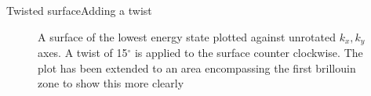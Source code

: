 \documentclass[9pt]{beamer}
\begin{document}
\begin{frame}{Twisted surface}{Adding a twist}
  \begin{figure}
    \centering
    \caption{A surface of the lowest energy state plotted against unrotated $k_x, k_y$ axes. A twist of 15$^\circ$ is applied to the surface counter clockwise. The plot has been extended to an area encompassing the first brillouin zone to show this more clearly}
  \end{figure}
\end{frame}
\end{document}
